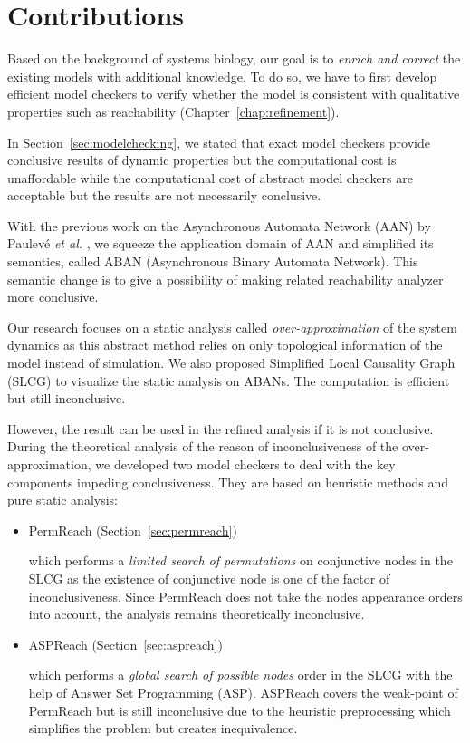 \section{Contributions}

Based on the background of systems biology, our goal is to \textit{enrich and correct} the existing models with additional knowledge.
To do so, we have to first develop efficient model checkers to verify whether the model is consistent with qualitative properties such as reachability (Chapter~\ref{chap:refinement}).

In Section~\ref{sec:modelchecking}, we stated that exact model checkers provide conclusive results of dynamic properties but the computational cost is unaffordable while the computational cost of abstract model checkers are acceptable but the results are not necessarily conclusive.

With the previous work on the Asynchronous Automata Network (AAN) by Paulev\'e \textit{et al.} \cite{folschette2015},
we squeeze the application domain of AAN and simplified its semantics, called ABAN (Asynchronous Binary Automata Network).
This semantic change is to give a possibility of making related reachability analyzer more conclusive.

Our research focuses on a static analysis called \textit{over-approximation} of the system dynamics as this abstract method relies on only topological information of the model instead of simulation.
We also proposed Simplified Local Causality Graph (SLCG) to visualize the static analysis on ABANs.
The computation is efficient but still inconclusive.

However, the result can be used in the refined analysis if it is not conclusive.
During the theoretical analysis of the reason of inconclusiveness of the over-approximation, we developed two model checkers to deal with the key components impeding conclusiveness.
They are based on heuristic methods and pure static analysis:
\begin{itemize}
    \item PermReach (Section~\ref{sec:permreach})
    
        which performs a \textit{limited search of permutations} on conjunctive nodes in the SLCG as the existence of conjunctive node is one of the factor of inconclusiveness.
        Since PermReach does not take the nodes appearance orders into account, the analysis remains theoretically inconclusive.
    \item ASPReach (Section~\ref{sec:aspreach})
        
        which performs a \textit{global search of possible nodes} order in the SLCG with the help of Answer Set Programming (ASP).
        ASPReach covers the weak-point of PermReach but is still inconclusive due to the heuristic preprocessing which simplifies the problem but creates inequivalence.
\end{itemize}

